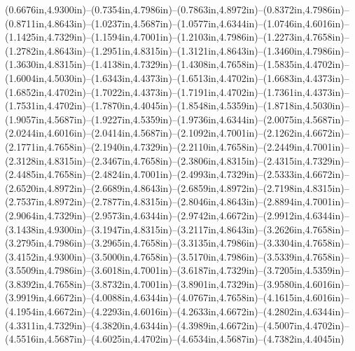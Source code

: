 (0.6676in,4.9300in)--(0.7354in,4.7986in)--(0.7863in,4.8972in)--(0.8372in,4.7986in)--(0.8711in,4.8643in)--(1.0237in,4.5687in)--(1.0577in,4.6344in)--(1.0746in,4.6016in)--(1.1425in,4.7329in)--(1.1594in,4.7001in)--(1.2103in,4.7986in)--(1.2273in,4.7658in)--(1.2782in,4.8643in)--(1.2951in,4.8315in)--(1.3121in,4.8643in)--(1.3460in,4.7986in)--(1.3630in,4.8315in)--(1.4138in,4.7329in)--(1.4308in,4.7658in)--(1.5835in,4.4702in)--(1.6004in,4.5030in)--(1.6343in,4.4373in)--(1.6513in,4.4702in)--(1.6683in,4.4373in)--(1.6852in,4.4702in)--(1.7022in,4.4373in)--(1.7191in,4.4702in)--(1.7361in,4.4373in)--(1.7531in,4.4702in)--(1.7870in,4.4045in)--(1.8548in,4.5359in)--(1.8718in,4.5030in)--(1.9057in,4.5687in)--(1.9227in,4.5359in)--(1.9736in,4.6344in)--(2.0075in,4.5687in)--(2.0244in,4.6016in)--(2.0414in,4.5687in)--(2.1092in,4.7001in)--(2.1262in,4.6672in)--(2.1771in,4.7658in)--(2.1940in,4.7329in)--(2.2110in,4.7658in)--(2.2449in,4.7001in)--(2.3128in,4.8315in)--(2.3467in,4.7658in)--(2.3806in,4.8315in)--(2.4315in,4.7329in)--(2.4485in,4.7658in)--(2.4824in,4.7001in)--(2.4993in,4.7329in)--(2.5333in,4.6672in)--(2.6520in,4.8972in)--(2.6689in,4.8643in)--(2.6859in,4.8972in)--(2.7198in,4.8315in)--(2.7537in,4.8972in)--(2.7877in,4.8315in)--(2.8046in,4.8643in)--(2.8894in,4.7001in)--(2.9064in,4.7329in)--(2.9573in,4.6344in)--(2.9742in,4.6672in)--(2.9912in,4.6344in)--(3.1438in,4.9300in)--(3.1947in,4.8315in)--(3.2117in,4.8643in)--(3.2626in,4.7658in)--(3.2795in,4.7986in)--(3.2965in,4.7658in)--(3.3135in,4.7986in)--(3.3304in,4.7658in)--(3.4152in,4.9300in)--(3.5000in,4.7658in)--(3.5170in,4.7986in)--(3.5339in,4.7658in)--(3.5509in,4.7986in)--(3.6018in,4.7001in)--(3.6187in,4.7329in)--(3.7205in,4.5359in)--(3.8392in,4.7658in)--(3.8732in,4.7001in)--(3.8901in,4.7329in)--(3.9580in,4.6016in)--(3.9919in,4.6672in)--(4.0088in,4.6344in)--(4.0767in,4.7658in)--(4.1615in,4.6016in)--(4.1954in,4.6672in)--(4.2293in,4.6016in)--(4.2633in,4.6672in)--(4.2802in,4.6344in)--(4.3311in,4.7329in)--(4.3820in,4.6344in)--(4.3989in,4.6672in)--(4.5007in,4.4702in)--(4.5516in,4.5687in)--(4.6025in,4.4702in)--(4.6534in,4.5687in)--(4.7382in,4.4045in) 